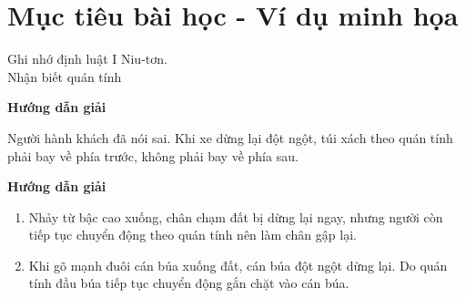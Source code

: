 \section{Mục tiêu bài học - Ví dụ minh họa}
\begin{dang}{Ghi nhớ định luật I Niu-tơn. \\ Nhận biết quán tính}
	{	\begin{center}
			\textbf{Hướng dẫn giải}
		\end{center}
		
		Người hành khách đã nói sai. Khi xe dừng lại đột ngột, túi xách theo quán tính phải bay về phía trước, không phải bay về phía sau.
		
	}
	{	\begin{center}
			\textbf{Hướng dẫn giải}
		\end{center}
		
		\begin{enumerate}[label=\alph*.]
			\item Nhảy từ bậc cao xuống, chân chạm đất bị dừng lại ngay, nhưng người còn tiếp tục chuyển động theo quán tính nên làm chân gập lại.  	
			\item Khi gõ mạnh đuôi cán búa xuống đất, cán búa đột ngột dừng lại. Do quán tính đầu búa tiếp tục chuyển động gắn chặt vào cán búa. 
		\end{enumerate}
	}
\end{dang}	
